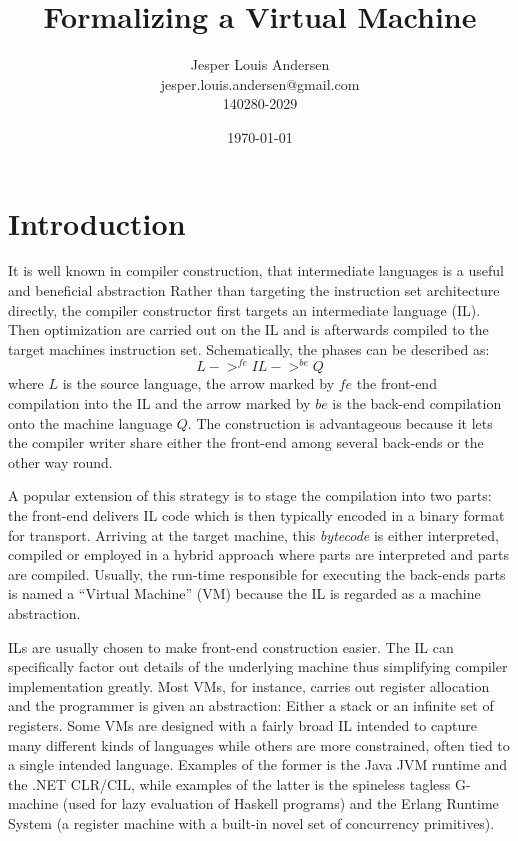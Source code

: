 \documentclass[a4paper, oneside, 10pt, draft]{memoir}
\author{Jesper Louis
  Andersen\\jesper.louis.andersen@gmail.com\\140280-2029}
\title{Formalizing a Virtual Machine}
\date{\today}
\begin{document}
\listoffixmes{}
\maketitle{}
\newpage{}
\tableofcontents{}
\newpage{}
\chapter{Introduction}

It is well known in compiler construction, that intermediate languages
is a useful and beneficial abstraction\cite{appel:1998:modern,
  mogensen:2008:basics} Rather than targeting the instruction set
architecture directly, the compiler constructor first targets an
intermediate language (IL). Then optimization are carried out on the
IL and is afterwards compiled to the target machines instruction
set. Schematically, the phases can be described as:
\begin{equation*}
  L ->^{fe} IL ->^{be} Q
\end{equation*}
where $L$ is the source language, the arrow marked by $fe$ the
front-end compilation into the IL and the arrow marked by $be$ is the
back-end compilation onto the machine language $Q$. The construction
is advantageous because it lets the compiler writer share either the
front-end among several back-ends or the other way round.

A popular extension of this strategy is to stage the compilation
into two parts: the front-end delivers IL code which is then typically
encoded in a binary format for transport. Arriving at the target
machine, this \emph{bytecode} is either interpreted, compiled or
employed in a hybrid approach where parts are interpreted and parts
are compiled. Usually, the run-time responsible for executing the
back-ends parts is named a ``Virtual Machine'' (VM) because the IL is
regarded as a machine abstraction.

ILs are usually chosen to make front-end construction easier. The IL
can specifically factor out details of the underlying machine thus
simplifying compiler implementation greatly. Most VMs, for instance,
carries out register allocation and the programmer is given an
abstraction: Either a stack or an infinite set of registers. Some VMs
are designed with a fairly broad IL intended to capture many different
kinds of languages while others are more constrained, often tied to a
single intended language. Examples of the former is the Java JVM
runtime\cite{lindholm.frank:1999:jvm} and the .NET
CLR/CIL, while examples of the latter is the spineless
tagless G-machine (used for lazy evaluation of Haskell programs) and
the Erlang Runtime System (a register machine with a built-in novel
set of concurrency primitives).
\end{document}
